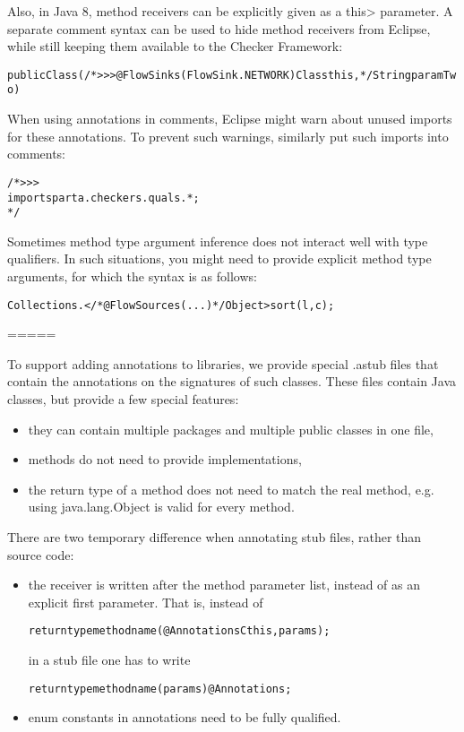 Also, in Java 8, method receivers can be explicitly given as a \<this>
parameter.
A separate comment syntax can be used to hide method receivers from
Eclipse, while still keeping them available to the Checker Framework:

\begin{alltt}
	public Class(/*>>> @FlowSinks(FlowSink.NETWORK) Class this, */ String paramTwo) {}
\end{alltt}

When using annotations in comments, Eclipse might warn about unused
imports for these annotations. To prevent such warnings, similarly put
such imports into comments:

\begin{alltt}
/*>>>
import sparta.checkers.quals.*;
*/
\end{alltt}

Sometimes method type argument inference does not interact well with
type qualifiers. In such situations, you might need to provide
explicit method type arguments, for which the syntax is as follows:

\begin{alltt}
	Collections.</*@FlowSources({...})*/ Object>sort(l, c);
\end{alltt}

=====

To support adding annotations to libraries, we provide special .astub
files that contain the annotations on the signatures of such classes.
These files contain Java classes, but provide a few special features:
\begin{itemize}
\item they can contain multiple packages and multiple public classes in
 one file,
\item methods do not need to provide implementations,
\item the return type of a method does not need to match the real method,
 e.g. using java.lang.Object is valid for every method.
\end{itemize}

There are two temporary difference when annotating stub files, rather
than source code:
\begin{itemize}
\item the receiver is written after the method parameter list, instead of
as an explicit first parameter.
That is, instead of

\begin{alltt}
     returntype methodname(@Annotations C this, params);
\end{alltt}

in a stub file one has to write

\begin{alltt}
     returntype methodname(params) @Annotations;
\end{alltt}

\item enum constants in annotations need to be fully qualified.
\end{itemize}


